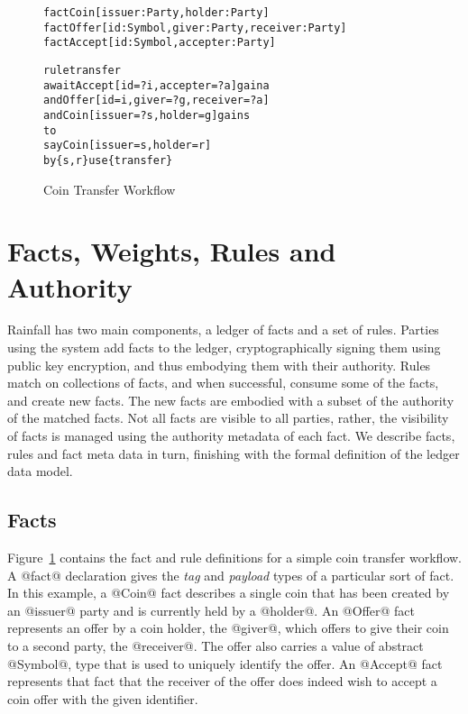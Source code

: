 
\clearpage{}


\begin{figure}
\begin{small}
\begin{alltt}
fact  Coin   [issuer: Party, holder: Party]
fact  Offer  [id: Symbol, giver: Party, receiver: Party]
fact  Accept [id: Symbol, accepter: Party]

rule  transfer
await Accept [id = ?i, accepter = ?a]  gain a
  and Offer  [id = i,  giver = ?g, receiver = ?a]
  and Coin   [issuer = ?s, holder = g] gain s
to
  say Coin   [issuer = s, holder = r]
   by \{s, r\} use \{transfer\}
\end{alltt}
\end{small}
\caption{Coin Transfer Workflow}
\label{f:CoinTransfer}
\end{figure}


\section{Facts, Weights, Rules and Authority}
Rainfall has two main components, a ledger of facts and a set of rules. Parties using the system add facts to the ledger, cryptographically signing them using public key encryption, and thus embodying them with their authority. Rules match on collections of facts, and when successful, consume some of the facts, and create new facts. The new facts are embodied with a subset of the authority of the matched facts. Not all facts are visible to all parties, rather, the visibility of facts is managed using the authority metadata of each fact. We describe facts, rules and fact meta data in turn, finishing with the formal definition of the ledger data model.


\subsection{Facts}
\label{s:Facts}
Figure~\ref{f:CoinTransfer} contains the fact and rule definitions for a simple coin transfer workflow. A @fact@ declaration gives the \emph{tag} and \emph{payload} types of a particular sort of fact. In this example, a @Coin@ fact describes a single coin that has been created by an @issuer@ party and is currently held by a @holder@. An @Offer@ fact represents an offer by a coin holder, the @giver@, which offers to give their coin to a second party, the @receiver@. The offer also carries a value of abstract @Symbol@, type that is used to uniquely identify the offer. An @Accept@ fact represents that fact that the receiver of the offer does indeed wish to accept a coin offer with the given identifier.

